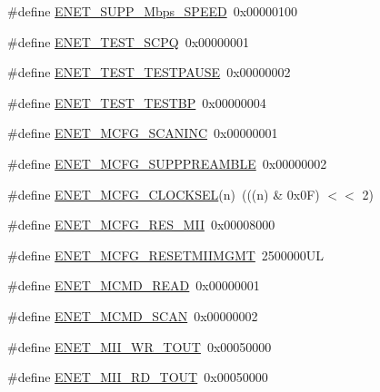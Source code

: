 \begin{DoxyCompactItemize}
\item 
\#define \hyperlink{group___e_n_e_t__17_x_x__40_x_x_ga66870c22b0f10f275b7b2c1e6d0709a0}{E\+N\+E\+T\+\_\+\+S\+U\+P\+P\+\_\+Mbps\+\_\+\+S\+P\+E\+E\+D}~0x00000100
\item 
\#define \hyperlink{group___e_n_e_t__17_x_x__40_x_x_gafa057fdcf20418b56df28532c048f038}{E\+N\+E\+T\+\_\+\+T\+E\+S\+T\+\_\+\+S\+C\+P\+Q}~0x00000001
\item 
\#define \hyperlink{group___e_n_e_t__17_x_x__40_x_x_gafa31bcfcbdb16b2dbfdc132568826153}{E\+N\+E\+T\+\_\+\+T\+E\+S\+T\+\_\+\+T\+E\+S\+T\+P\+A\+U\+S\+E}~0x00000002
\item 
\#define \hyperlink{group___e_n_e_t__17_x_x__40_x_x_ga89c6649c9c320cd57d5bc82b1ecf42ee}{E\+N\+E\+T\+\_\+\+T\+E\+S\+T\+\_\+\+T\+E\+S\+T\+B\+P}~0x00000004
\item 
\#define \hyperlink{group___e_n_e_t__17_x_x__40_x_x_gade8846eaaed89450478cf7e8dd07beb2}{E\+N\+E\+T\+\_\+\+M\+C\+F\+G\+\_\+\+S\+C\+A\+N\+I\+N\+C}~0x00000001
\item 
\#define \hyperlink{group___e_n_e_t__17_x_x__40_x_x_ga9f39657f690648231761d2aea5aee7cb}{E\+N\+E\+T\+\_\+\+M\+C\+F\+G\+\_\+\+S\+U\+P\+P\+P\+R\+E\+A\+M\+B\+L\+E}~0x00000002
\item 
\#define \hyperlink{group___e_n_e_t__17_x_x__40_x_x_ga00253a49de1cfbbb4ad88f7563ce5954}{E\+N\+E\+T\+\_\+\+M\+C\+F\+G\+\_\+\+C\+L\+O\+C\+K\+S\+E\+L}(n)~(((n) \& 0x0\+F) $<$$<$ 2)
\item 
\#define \hyperlink{group___e_n_e_t__17_x_x__40_x_x_gaf31c596c785314febc778a974cefa64e}{E\+N\+E\+T\+\_\+\+M\+C\+F\+G\+\_\+\+R\+E\+S\+\_\+\+M\+I\+I}~0x00008000
\item 
\#define \hyperlink{group___e_n_e_t__17_x_x__40_x_x_gafd634c8258b41a78b89aff1fa4558996}{E\+N\+E\+T\+\_\+\+M\+C\+F\+G\+\_\+\+R\+E\+S\+E\+T\+M\+I\+I\+M\+G\+M\+T}~2500000\+U\+L
\item 
\#define \hyperlink{group___e_n_e_t__17_x_x__40_x_x_ga07dfdda78003dd5af6254fc863ae019e}{E\+N\+E\+T\+\_\+\+M\+C\+M\+D\+\_\+\+R\+E\+A\+D}~0x00000001
\item 
\#define \hyperlink{group___e_n_e_t__17_x_x__40_x_x_ga77d7e45ecfbd3f0bace6900cc69b8beb}{E\+N\+E\+T\+\_\+\+M\+C\+M\+D\+\_\+\+S\+C\+A\+N}~0x00000002
\item 
\#define \hyperlink{group___e_n_e_t__17_x_x__40_x_x_ga41de953453bd483f8c9d5805c54010b3}{E\+N\+E\+T\+\_\+\+M\+I\+I\+\_\+\+W\+R\+\_\+\+T\+O\+U\+T}~0x00050000
\item 
\#define \hyperlink{group___e_n_e_t__17_x_x__40_x_x_ga68db523c6f21026af56d79f5af27b9d1}{E\+N\+E\+T\+\_\+\+M\+I\+I\+\_\+\+R\+D\+\_\+\+T\+O\+U\+T}~0x00050000
$$
\end{DoxyCompactItemize}
